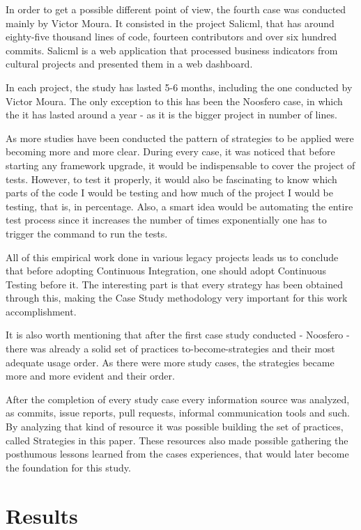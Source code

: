 In order to get a possible different point of view, the fourth case was
conducted mainly by Victor Moura. It consisted in the project Salicml, that has
around eighty-five thousand lines of code, fourteen contributors and over six
hundred commits. Salicml is a web application that processed business indicators
from cultural projects and presented them in a web dashboard.

In each project, the study has lasted 5-6 months, including the one conducted by
Victor Moura. The only exception to this has been the Noosfero case, in which
the it has lasted around a year - as it is the bigger project in number of
lines.

As more studies have been conducted the pattern of strategies to be applied were
becoming more and more clear. During every case, it was noticed that before
starting any framework upgrade, it would be indispensable to cover the project
of tests. However, to test it properly, it would also be fascinating to know
which parts of the code I would be testing and how much of the project I would
be testing, that is, in percentage. Also, a smart idea would be automating the
entire test process since it increases the number of times exponentially one has
to trigger the command to run the tests.

All of this empirical work done in various legacy projects leads us to conclude
that before adopting Continuous Integration, one should adopt Continuous Testing
before it. The interesting part is that every strategy has been obtained through
this, making the Case Study methodology very important for this work
accomplishment.

It is also worth mentioning that after the first case study conducted - Noosfero
- there was already a solid set of practices to-become-strategies and their most
adequate usage order. As there were more study cases, the strategies became more
and more evident and their order.

After the completion of every study case every information source was analyzed,
as commits, issue reports, pull requests, informal communication tools and such.
By analyzing that kind of resource it was possible building the set of
practices, called Strategies in this paper. These resources also made possible
gathering the posthumous lessons learned from the cases experiences, that would
later become the foundation for this study.

\section{Results}

